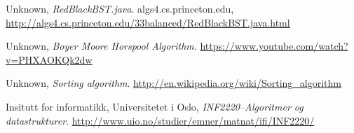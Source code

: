 \documentclass[11pt,a4paper]{article}
\theoremstyle{def}
\begin{document}
\begin{thebibliography}{}

  Unknown,
  \emph{RedBlackBST.java}.
  algs4.cs.princeton.edu,
  \url{http://algs4.cs.princeton.edu/33balanced/RedBlackBST.java.html}

  Unknown,
  \emph{Boyer Moore Horspool Algorithm}.
  \url{https://www.youtube.com/watch?v=PHXAOKQk2dw}

  Unknown,
  \emph{Sorting algorithm}.
  \url{http://en.wikipedia.org/wiki/Sorting_algorithm}

 Insitutt for informatikk, Universitetet i Oslo,
  \emph{INF2220--Algoritmer og datastrukturer}.
  \url{http://www.uio.no/studier/emner/matnat/ifi/INF2220/}



\end{thebibliography}
\end{document}
